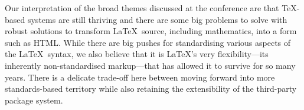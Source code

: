 \documentclass{ltnews}
\begin{document}
Our interpretation of the broad themes discussed at the conference are that
\TeX-based systems are still thriving and there are some big problems to solve
with robust solutions to transform \LaTeX\ source, including mathematics, into
a form such as HTML. While there are big pushes for standardising various aspects
of the \LaTeX\ syntax, we also believe that it is \LaTeX's very
flexibility---its inherently non-standardised markup---that has allowed it to
survive for so many years. There is a delicate trade-off here between moving
forward into more standards-based territory while also retaining the
extensibility of the third-party package system.
\end{document}
